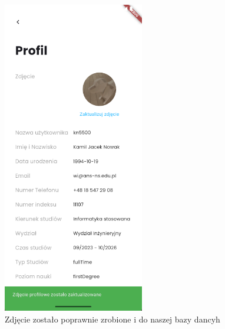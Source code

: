 \begin{figure}[h!]
	\centering
	\includegraphics[width=0.55\textwidth]{rys/ekranustawienv4.png}
	\caption{Zdjęcie zostało poprawnie zrobione i do naszej bazy dancyh}
	\label{rys:ekranustawienv4}
\end{figure}
\newpage
